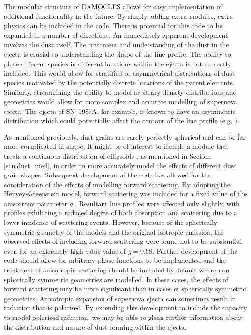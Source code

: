 The modular structure of DAMOCLES allows for easy implementation of additional functionality in the future.  By simply adding extra modules, extra physics can be included in the code.  There is potential for this code to be expanded in a number of directions.  An immediately apparent development involves the dust itself.  The treatment and understanding of the dust in the ejecta is crucial to understanding the shape of the line profile.  The ability to place different species in different locations within the ejecta is not currently included.  This would allow for stratified or asymmetrical distributions of dust species motivated by the potentially discrete locations of the parent elements.  Similarly, streamlining the ability to model arbitrary density distributions and geometries would allow for more complex and accurate modelling of supernova ejecta.  The ejecta of SN~1987A, for example, is known to have an asymmetric distribution which could potentially affect the contour of the line profile (e.g. \citet{Sinnott2013}).

As mentioned previously, dust grains are rarely perfectly spherical and can be far more complicated in shape.  It might be of interest to include a module that treats a continuous distribution of ellipsoids  \citep{Bohren1983}, as mentioned in Section \ref{scn:dust_med}, in order to more accurately model the effects of different dust grain shapes.
%
Subsequent development of the code has allowed for the consideration of the effects of modelling forward scattering.  By adopting the Henyey-Greenstein model, forward scattering was included for a fixed value of the anisotropy parameter $g$ \citep{Henyey1941}.  Resultant line profiles were affected only slightly, with profiles exhibiting a reduced degree of both absorption and scattering due to a lower incidence of scattering events.  However, because of the spherically symmetric geometry of the models and the original isotropic emission, the observed effects of including forward scattering were found not to be substantial even for an extremely high value value of $g = 0.98$.  Further development of the code should allow for arbitrary phase functions to be implemented and the treatment of anisotropic scattering should be included by default where non-spherically symmetric geometries are modelled.  In these cases, the effects of forward scattering may be more significant than in cases of spherically symmetric geometries.  Anisotropic expansion of supernova ejecta can sometimes result in radiation that is polarised.  By extending this development to include the capacity to model polarised radiation, we may be able to glean further information about the distribution and nature of dust forming within the ejecta.  

